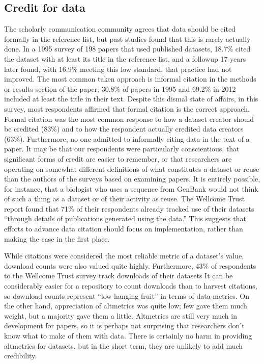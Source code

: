 \documentclass[10pt]{article}
\begin{document}
\subsection*{Credit for data}

The scholarly communication community agrees that data should be cited formally in the reference list,\cite{force11_data_citation_synthesis_group_joint_2014} but past studies found that this is rarely actually done.\cite{sieber_not_1995, mooney_citing_2011, mooney_anatomy_2012}
In a 1995 survey of 198 papers that used published datasets, 18.7\% cited the dataset with at least its title in the reference list\cite{sieber_not_1995}, and a followup 17 years later found, with 16.9\% meeting this low standard, that practice had not improved.\cite{mooney_anatomy_2012}
The most common taken approach is informal citation in the methods or results section of the paper; 30.8\% of papers in 1995 and 69.2\% in 2012 included at least the title in their text.
Despite this dismal state of affairs, in this survey, most respondents affirmed that formal citation is the correct approach.
Formal citation was the most common response to how a dataset creator should be credited (83\%) and to how the respondent actually credited data creators (63\%).
Furthermore, no one admitted to informally citing data in the text of a paper.
It may be that our respondents were particularly conscientious, that significant forms of credit are easier to remember, or that researchers are operating on somewhat different definitions of what constitutes a dataset or reuse than the authors of the surveys based on examining papers.
It is entirely possible, for instance, that a biologist who uses a sequence from GenBank would not think of such a thing as a dataset or of their activity as reuse.
The Wellcome Trust report found that 71\% of their respondents already tracked use of their datasets ``through details of publications generated using the data.''\cite{bobrow_establishing_2014} 
This suggests that efforts to advance data citation should focus on implementation, rather than making the case in the first place.

While citations were considered the most reliable metric of a dataset's value, download counts were also valued quite highly.
Furthermore, 43\% of respondents to the Wellcome Trust survey track downloads of their datasets\cite{bobrow_establishing_2014}
It can be considerably easier for a repository to count downloads than to harvest citations, so download counts represent ``low hanging fruit'' in terms of data metrics.
On the other hand, appreciation of altmetrics was quite low; few gave them much weight, but a majority gave them a little.
Altmetrics are still very much in development for papers, so it is perhaps not surprising that researchers don't know what to make of them with data.
There is certainly no harm in providing altmetrics for datasets, but in the short term, they are unlikely to add much credibility.
\end{document}
